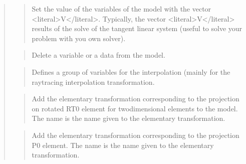 \documentclass[a4paper,11pt,english]{sphinxmanual}
\begin{document}
\begin{quote}
\begin{quote}
\sphinxAtStartPar
Set the value of the variables of the model with the vector \textless{}literal\textgreater{}V\textless{}/literal\textgreater{}.
Typically, the vector \textless{}literal\textgreater{}V\textless{}/literal\textgreater{} results of the solve of the tangent
linear system (useful to solve your problem with you own solver).
\end{quote}

\sphinxAtStartPar
{}
\begin{quote}

\sphinxAtStartPar
Delete a variable or a data from the model.
\end{quote}

\sphinxAtStartPar
{}
\begin{quote}

\sphinxAtStartPar
Defines a group of variables for the interpolation (mainly for the
raytracing interpolation transformation.
\end{quote}

\sphinxAtStartPar
{}
\begin{quote}

\sphinxAtStartPar
Add the elementary transformation corresponding to the projection
on rotated RT0 element for two\sphinxhyphen{}dimensional elements to the model.
The name is the name given to the elementary transformation.
\end{quote}

\sphinxAtStartPar
{}
\begin{quote}

\sphinxAtStartPar
Add the elementary transformation corresponding to the projection
P0 element.
The name is the name given to the elementary transformation.
\end{quote}

\sphinxAtStartPar
{}
\begin{quote}


\end{quote}
\end{quote}
\end{document}
